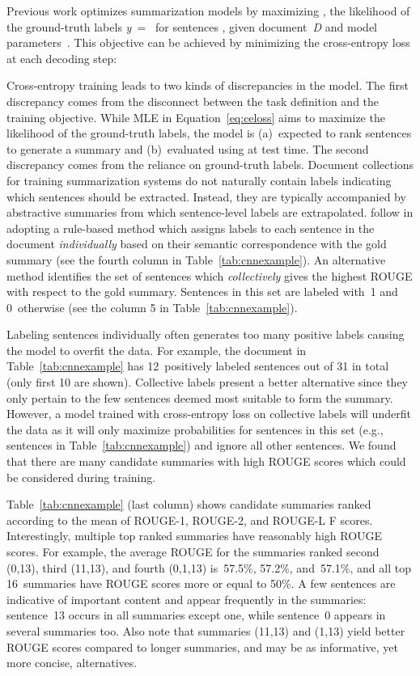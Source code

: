 \documentclass[11pt,a4paper]{article}
\newcommand\doc{{\it D }}
\newcommand\labels{{\it y }}
\newcommand\labelseq{{} }
\begin{document}
Previous work 
optimizes summarization
models by maximizing , the likelihood of the ground-truth labels
\mbox{\labels = \labelseq} for sentences , given
document~\doc and model parameters~. This objective can be
achieved by minimizing the cross-entropy loss at each decoding step:


Cross-entropy training leads to two kinds of discrepancies in the
model. The first discrepancy comes from the disconnect between the
task definition and the training objective. While MLE in
Equation~\eqref{eq:celoss} aims to maximize the likelihood of the
ground-truth labels, the model is (a)~expected to rank sentences to
generate a summary and (b)~evaluated using  at test
time. The second discrepancy comes from the reliance on ground-truth
labels. Document collections for training summarization systems do not
naturally contain labels indicating which sentences should be
extracted. Instead, they are typically accompanied by abstractive
summaries from which sentence-level labels are
extrapolated.  follow  in
adopting a rule-based method which assigns labels to each sentence in
the document \emph{individually} based on their semantic
correspondence with the gold summary (see the fourth column in
Table~\ref{tab:cnnexample}). An alternative method
\cite{svore-emnlp07,Cao:2016,nallapati17} identifies the set of
sentences which \emph{collectively} gives the highest ROUGE with
respect to the gold summary. Sentences in this set are labeled with~1
and 0~otherwise (see the column 5 in Table~\ref{tab:cnnexample}).

Labeling sentences individually often generates too many positive
labels causing the model to overfit the data. For example, the
document in Table~\ref{tab:cnnexample} has 12~positively labeled
sentences out of 31 in total (only first 10 are shown). Collective
labels present a better alternative since they only pertain to the few
sentences deemed most suitable to form the summary. However, a model
trained with cross-entropy loss on collective labels will underfit the
data as it will only maximize probabilities 
for sentences in this set (e.g., sentences  in
Table~\ref{tab:cnnexample}) and ignore all other sentences. We found
that there are many candidate summaries with high ROUGE scores which
could be considered during training. 

Table~\ref{tab:cnnexample} (last column) shows candidate summaries 
ranked according to the mean of \mbox{ROUGE-1}, \mbox{ROUGE-2}, and
\mbox{ROUGE-L} F scores. Interestingly, multiple top ranked summaries have reasonably high
ROUGE scores. For example, the average ROUGE for the summaries ranked
second (0,13), third (11,13), and fourth (0,1,13) is~57.5\%, 57.2\%,
and~57.1\%, and all top 16~summaries have ROUGE scores more or equal
to 50\%. A few sentences are indicative of important content and
appear frequently in the summaries: sentence~13 occurs in all
summaries except one, while sentence~0 appears in several summaries
too. Also note that summaries (11,13) and (1,13) yield better ROUGE
scores compared to longer summaries, and may be as informative, yet
more concise, alternatives.
\end{document}
